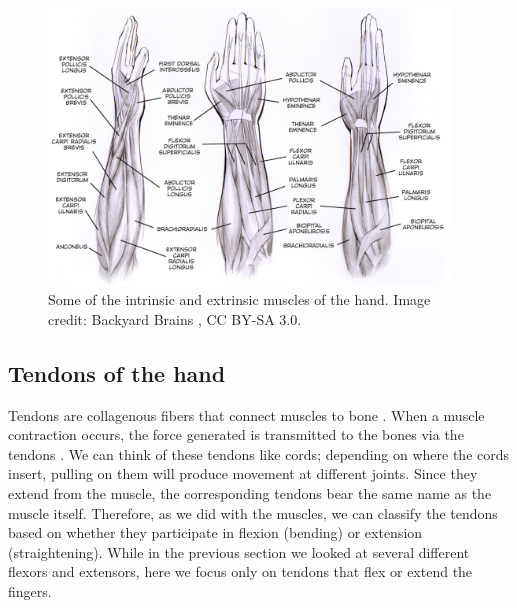 \documentclass[12pt]{article}
\begin{document}
\begin{figure}[h!]
\centering
\includegraphics[width=0.95\textwidth]{images/muscles_of_hand.jpg}
\caption{Some of the intrinsic and extrinsic muscles of the hand. Image credit: Backyard Brains \citep{backyardBrainsHand}, CC BY-SA 3.0.}
\label{fig:extMuscles}
\end{figure}

\subsection*{Tendons of the hand}  
Tendons are collagenous fibers that connect muscles to bone \citep{tortora2014principles}. When a muscle contraction occurs, the force generated is transmitted to the bones via the tendons \citep{kirkendall1997function}. We can think of these tendons like cords; depending on where the cords insert, pulling on them will produce movement at different joints. 
Since they extend from the muscle, the corresponding tendons bear the same name as the muscle itself. Therefore, as we did with the muscles, we can classify the tendons based on whether they participate in flexion (bending) or extension (straightening). While in the previous section we looked at several different flexors and extensors, here we focus only on tendons that flex or extend the fingers.
\end{document}
